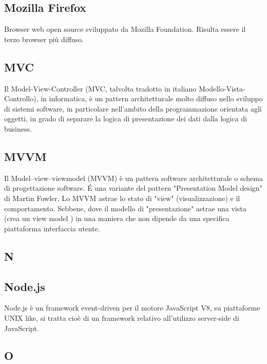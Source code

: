 \subsection{Mozilla Firefox}
Browser web open source sviluppato da Mozilla Foundation. Risulta essere il terzo
browser più diffuso.

\subsection{MVC}
Il Model-View-Controller (MVC, talvolta tradotto in italiano Modello-Vista-Controllo), in informatica, è un pattern architetturale molto diffuso nello sviluppo di sistemi software, in particolare nell'ambito della programmazione orientata agli oggetti, in grado di separare la logica di presentazione dei dati dalla logica di business.

\subsection{MVVM}
Il Model–view–viewmodel (MVVM) è un pattern software architetturale o schema di progettazione software. É una variante del pattern "Presentation Model design" di Martin Fowler. Lo MVVM astrae lo stato di "view" (visualizzazione) e il comportamento. Sebbene, dove il modello di "presentazione" astrae una vista (crea un view model ) in una maniera che non dipende da una specifica piattaforma interfaccia utente.

\newpage

\begin{center}
\Huge\section{\uppercase{N}}
\end{center}

\subsection{Node.js}
Node.js è un framework event-driven per il motore JavaScript V8, su piattaforme UNIX
like, si tratta cioè di un framework relativo all'utilizzo server-side di JavaScript.

\newpage

\begin{center}
\Huge\section{\uppercase{O}}
\end{center}

